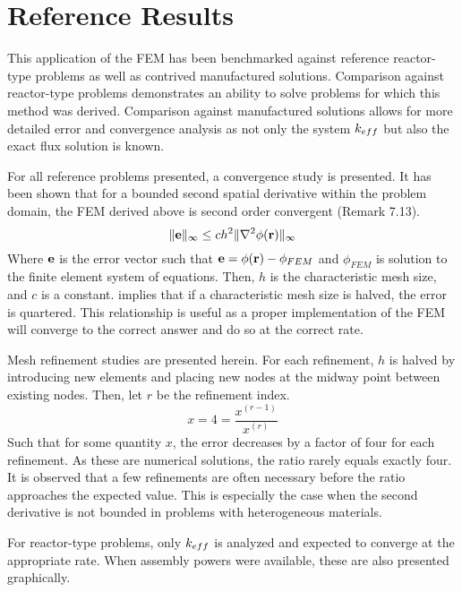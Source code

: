 \section{Reference Results}
  This application of the FEM has been benchmarked against reference 
  reactor-type problems as well as contrived manufactured solutions. Comparison
  against reactor-type problems demonstrates an ability to solve problems for
  which this method was derived. Comparison against manufactured solutions 
  allows for more detailed error and convergence analysis as not only the system
  $k_{eff}$ but also the exact flux solution is known.
  
  For all reference problems presented, a convergence study is presented. It has 
  been shown that for a bounded second spatial derivative within the problem 
  domain, the FEM derived above is second order convergent \cite{textbookli} 
  (Remark 7.13).
  \begin{equation} \label{eq:error_bound}
    \|\mathbf{e}\|_{\infty} \le c h^2 \| \mathbf{\nabla}^2 \phi(\mathbf{r}) \|_{\infty}
  \end{equation}
  Where $\mathbf{e}$ is the error vector such that $\mathbf{e} = \phi(\mathbf{r}) - \phi_{FEM}$ and
  $\phi_{FEM}$ is solution to the finite element system of equations. Then,
  $h$ is the characteristic mesh size, and $c$ is a constant. 
   implies that if a characteristic mesh size is halved, 
  the error is quartered. This relationship is useful as a proper implementation 
  of the FEM will converge to the correct answer and do so at the correct rate.
  
  Mesh refinement studies are presented herein. For each refinement, $h$ is 
  halved by introducing new elements and placing new nodes at the midway point
  between existing nodes. Then, let $r$ be the refinement index.
  \begin{equation}
    x = 4 = \frac{x^{(r-1)}}{x^{(r)}}
  \end{equation}
  Such that for some quantity $x$, the error decreases by a factor of four for 
  each refinement. As these are numerical solutions, the ratio rarely equals 
  exactly four. It is observed that a few refinements are often necessary 
  before the ratio approaches the expected value. This is especially the case
  when the second derivative is not bounded in problems with heterogeneous 
  materials.
  
  For reactor-type problems, only $k_{eff}$ is analyzed and expected to converge
  at the appropriate rate. When assembly powers were available, these are also
  presented graphically. 
  

